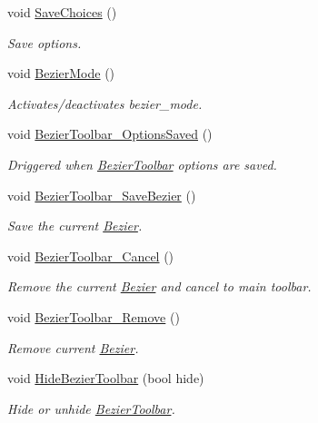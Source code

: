 \begin{DoxyCompactItemize}
void \mbox{\hyperlink{classGUI_a00fb847ea0a8249acaaf70c0f3ba3fd4}{Save\+Choices}} ()
\begin{DoxyCompactList}\small\item\em Save options. \end{DoxyCompactList}\item 
\mbox{\label{classGUI_ac0cb178a0a36573f7d99a104dd84f5ed}} 
void \mbox{\hyperlink{classGUI_ac0cb178a0a36573f7d99a104dd84f5ed}{Bezier\+Mode}} ()
\begin{DoxyCompactList}\small\item\em Activates/deactivates bezier\+\_\+mode. \end{DoxyCompactList}\item 
void \mbox{\hyperlink{classGUI_a593ffaac7d8a664f20893aed2536988b}{Bezier\+Toolbar\+\_\+\+Options\+Saved}} ()
\begin{DoxyCompactList}\small\item\em Driggered when \mbox{\hyperlink{structBezierToolbar}{Bezier\+Toolbar}} options are saved. \end{DoxyCompactList}\item 
void \mbox{\hyperlink{classGUI_a6f27f73cf15f18dfa206630cc77bc7df}{Bezier\+Toolbar\+\_\+\+Save\+Bezier}} ()
\begin{DoxyCompactList}\small\item\em Save the current \mbox{\hyperlink{classBezier}{Bezier}}. \end{DoxyCompactList}\item 
\mbox{\label{classGUI_a8e851696d9c01c19a3afc7bdc0fbe54f}} 
void \mbox{\hyperlink{classGUI_a8e851696d9c01c19a3afc7bdc0fbe54f}{Bezier\+Toolbar\+\_\+\+Cancel}} ()
\begin{DoxyCompactList}\small\item\em Remove the current \mbox{\hyperlink{classBezier}{Bezier}} and cancel to main toolbar. \end{DoxyCompactList}\item 
\mbox{\label{classGUI_a508f3c222bb40b6cf139fc346e562564}} 
void \mbox{\hyperlink{classGUI_a508f3c222bb40b6cf139fc346e562564}{Bezier\+Toolbar\+\_\+\+Remove}} ()
\begin{DoxyCompactList}\small\item\em Remove current \mbox{\hyperlink{classBezier}{Bezier}}. \end{DoxyCompactList}\item 
void \mbox{\hyperlink{classGUI_ae36c91ff70502eeecb985c3b84aa3a07}{Hide\+Bezier\+Toolbar}} (bool hide)
\begin{DoxyCompactList}\small\item\em Hide or unhide \mbox{\hyperlink{structBezierToolbar}{Bezier\+Toolbar}}. \end{DoxyCompactList}\end{DoxyCompactItemize}



